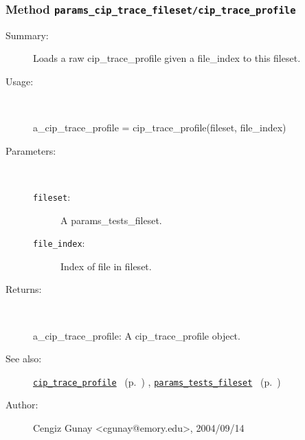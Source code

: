 \subsubsection[Method \texttt{cip\_trace\_profile}]{Method \texttt{params\_cip\_trace\_fileset/cip\_trace\_profile}}%
%
\label{ref_params_cip_trace_fileset__cip_trace_profile}%
\hypertarget{ref_params_cip_trace_fileset__cip_trace_profile}{}%
\begin{description}
\item[Summary:]Loads a raw cip\_trace\_profile given a file\_index 
		      to this fileset.
%
\item[Usage:]~%
\begin{lyxcode}%
a\_cip\_trace\_profile = cip\_trace\_profile(fileset, file\_index)
%
\end{lyxcode}%
%
%
\item[Parameters:]~
\begin{description}%
\item[\texttt{fileset}:]
 A params\_tests\_fileset.
\item[\texttt{file\_index}:]
 Index of file in fileset.
\end{description}%
%
\item[Returns:
]~

	a\_cip\_trace\_profile: A cip\_trace\_profile object.
%
%
\item[See also:]%
\hyperlink{ref_cip_trace_profile}{\texttt{cip\_trace\_profile}}%
\ (p.~\pageref{ref_cip_trace_profile})%
%
, \hyperlink{ref_params_tests_fileset}{\texttt{params\_tests\_fileset}}%
\ (p.~\pageref{ref_params_tests_fileset})%
%
%
\item[Author:]%
Cengiz Gunay <cgunay@emory.edu>, 2004/09/14
%
\end{description}
\methodline%
